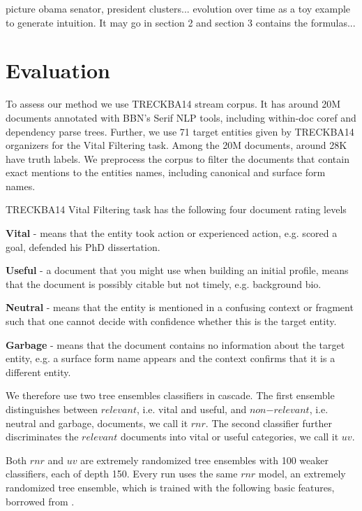 \documentclass{article}
\begin{document}
picture obama senator, president clusters... evolution over time as a toy example to generate intuition. It may go in section 2 and section 3 contains the formulas... 

\section{Evaluation}
\label{evaluation}

To assess our method we use TRECKBA14 stream corpus. It has around 20M documents annotated with BBN's Serif NLP tools, including within-doc coref and dependency parse trees. Further, we use 71 target entities given by TRECKBA14 organizers for the Vital Filtering task. Among the 20M documents, around 28K have truth labels. We preprocess the corpus to filter the documents that contain exact mentions to the entities names, including canonical and surface form names.

TRECKBA14 Vital Filtering task has the following four document rating levels

\begin{itemize*}
  \item \textbf{Vital} - means that the entity took action or experienced action, e.g. scored a goal, defended his PhD dissertation.
  \item \textbf{Useful} - a document that you might use when building an initial profile, means that the document is possibly citable but not timely, e.g. background bio.
  \item \textbf{Neutral} - means that the entity is mentioned in a confusing context or fragment such that one cannot decide with confidence whether this is the target entity.
  \item \textbf{Garbage} - means that the document contains no information about the target entity, e.g. a surface form name appears and the context confirms that it is a different entity.
\end{itemize*}

We therefore use two tree ensembles classifiers in cascade. The first ensemble distinguishes between $relevant$, i.e. vital and useful, and $non\mathord{-}relevant$, i.e. neutral and garbage, documents, we call it $rnr$. The second classifier further discriminates the $relevant$ documents into vital or useful categories, we call it $uv$.

Both $rnr$ and $uv$ are extremely randomized tree ensembles \cite{GEW06a} with 100 weaker classifiers, each of depth 150.
Every run uses the same $rnr$ model, an extremely randomized tree ensemble, which is trained with the following basic features, borrowed from \cite{jingang13}.
\end{document}
